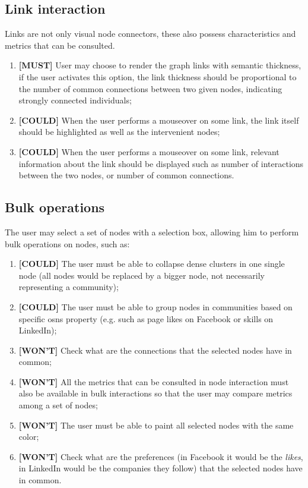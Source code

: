 \subsection{Link interaction}

Links are not only visual node connectors, these also possess characteristics and metrics that can be consulted.

\begin{enumerate}
    \item \textbf{[MUST]} User may choose to render the graph links with semantic thickness, if the user activates this option, the link thickness should be
    proportional to the number of common connections between two given nodes, indicating strongly connected individuals;
    \item \textbf{[COULD]} When the user performs a mouseover on some link, the link itself should be highlighted as well as the intervenient nodes;
    \item \textbf{[COULD]} When the user performs a mouseover on some link, relevant information about the link should be displayed such as number of interactions between the two nodes, or number of common connections.
\end{enumerate}

\subsection{Bulk operations}

The user may select a set of nodes with a selection box, allowing him to perform bulk operations on nodes, such as:

\begin{enumerate}
    \item \textbf{[COULD]} The user must be able to collapse dense clusters in one single node (all nodes would be replaced by a bigger node, not necessarily representing a community); %
    \item \textbf{[COULD]} The user must be able to group nodes in communities based on specific \glspl{osn} property (e.g. such as page likes on Facebook or skills on LinkedIn);
    \item \textbf{[WON'T]} Check what are the connections that the selected nodes have in common;
    \item \textbf{[WON'T]} All the metrics that can be consulted in node interaction must also be available in bulk interactions so that the user may compare metrics among a set of nodes;
    \item \textbf{[WON'T]} The user must be able to paint all selected nodes with the same color;
    \item \textbf{[WON'T]} Check what are the preferences (in Facebook it would be the \textit{likes}, in LinkedIn would be the companies they follow) that the selected nodes have in common.
\end{enumerate}

